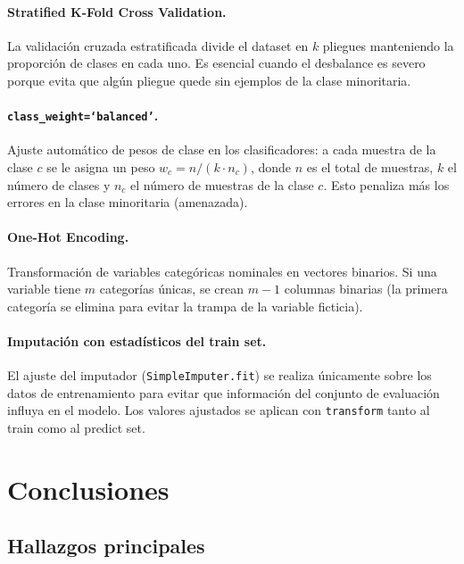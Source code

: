 \documentclass[12pt,a4paper]{article}
\begin{document}
\paragraph{Stratified K-Fold Cross Validation.}
La validación cruzada estratificada divide el dataset en $k$ pliegues manteniendo la
proporción de clases en cada uno.  Es esencial cuando el desbalance es severo porque
evita que algún pliegue quede sin ejemplos de la clase minoritaria.

\paragraph{\texttt{class\_weight=`balanced'}.}
Ajuste automático de pesos de clase en los clasificadores: a cada muestra de la clase
$c$ se le asigna un peso $w_c = n / (k \cdot n_c)$, donde $n$ es el total de muestras,
$k$ el número de clases y $n_c$ el número de muestras de la clase $c$.
Esto penaliza más los errores en la clase minoritaria (amenazada).

\paragraph{One-Hot Encoding.}
Transformación de variables categóricas nominales en vectores binarios.
Si una variable tiene $m$ categorías únicas, se crean $m-1$ columnas binarias
(la primera categoría se elimina para evitar la trampa de la variable ficticia).

\paragraph{Imputación con estadísticos del train set.}
El ajuste del imputador (\texttt{SimpleImputer.fit}) se realiza únicamente sobre los datos
de entrenamiento para evitar que información del conjunto de evaluación influya en el modelo.
Los valores ajustados se aplican con \texttt{transform} tanto al train como al predict set.

\section{Conclusiones}

\subsection{Hallazgos principales}
\label{sec:hallazgos}
\end{document}
